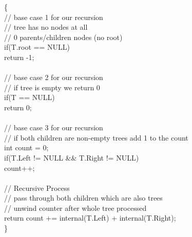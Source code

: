 \documentclass{article}
\begin{document}
\hspace*{50pt}\{\\
\hspace*{65pt}// base case 1 for our recursion\\
\hspace*{65pt}// tree has no nodes at all \\
\hspace*{65pt}// 0 parents/children nodes (no root)\\
\hspace*{65pt} if(T.root == NULL)\\
\hspace*{80pt} return -1;\\\\
\hspace*{65pt}// base case 2 for our recursion \\
\hspace*{65pt}// if tree is empty we return 0 \\
\hspace*{65pt} if(T == NULL)\\
\hspace*{80pt} return 0;\\\\
\hspace*{65pt}// base case 3 for our recursion \\
\hspace*{65pt}// if both children are non-empty trees add 1 to the count \\
\hspace*{65pt} int count = 0;\\
\hspace*{65pt} if(T.Left != NULL \&\& T.Right != NULL)\\
\hspace*{80pt} count++;\\\\
\hspace*{65pt}// Recursive Process \\
\hspace*{65pt}// pass through both children which are also trees \\
\hspace*{65pt}// unwind counter after whole tree processed \\
\hspace*{65pt} return count += internal(T.Left) + internal(T.Right);\\
\hspace*{50pt}\}\\\\
\end{document}

